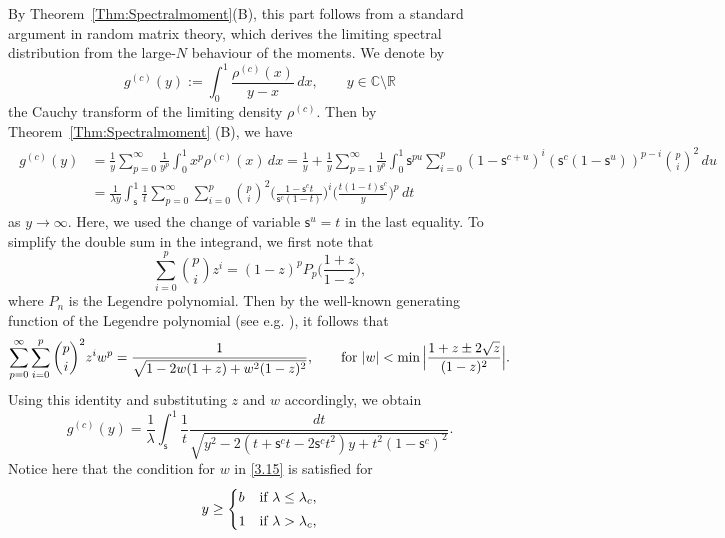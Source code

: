 \documentclass{amsart}
\def\C{\mathbb{C}}
\def\R{\mathbb{R}}
\theoremstyle{plain}
\theoremstyle{remark}
\newcommand{\abs}[1]{\lvert#1\rvert}
\numberwithin{equation}{section}
\begin{document}
By Theorem~\ref{Thm:Spectralmoment}(B), this part follows from a standard argument in random matrix theory, which derives the limiting spectral distribution from the large-$N$ behaviour of the moments.
We denote by  
\begin{equation}
    g^{(c)}(y):=\int_{0}^{1}\frac{\rho^{(c)}(x)}{y-x} \, dx, \qquad y \in \C\setminus \R 
\end{equation}
the Cauchy transform of the limiting density $\rho^{(c)}$. Then by Theorem~\ref{Thm:Spectralmoment} (B), we have 
\begin{align}
\begin{split}
    g^{(c)}(y)
    &= \frac{1}{y}\sum_{p=0}^{\infty}\frac{1}{y^{p}}\int_{0}^{1}x^{p}\rho^{(c)}(x) \, dx
    =\frac{1}{y}+\frac{1}{y}\sum_{p=1}^{\infty}\frac{1}{y^{p}}\int_{0}^{1}\mathsf{s}^{pu}\sum_{i=0}^{p}(1-\mathsf{s}^{c+u})^{i}(\mathsf{s}^{c}(1-\mathsf{s}^{u}))^{p-i}\binom{p}{i}^{2}\, du\\
    &=\frac{1}{\lambda y}\int_{\mathsf{s}}^{1}\frac{1}{t}\sum_{p=0}^{\infty}\sum_{i=0}^{p}\binom{p}{i}^{2}\Big(\frac{1-\mathsf{s}^{c}t}{\mathsf{s}^{c}(1-t)}\Big)^{i}\Big(\frac{t(1-t)\mathsf{s}^{c}}{y}\Big)^{p}\, dt
\end{split}
\end{align} 
as $ y \to \infty.$ Here, we used the change of variable $\mathsf{s}^{u}=t$ in the last equality.
To simplify the double sum in the integrand, we first note that
\begin{equation}
    \sum_{i=0}^{p}\binom{p}{i}z^{i}=(1-z)^{p}P_{p}\Big(\frac{1+z}{1-z}\Big),
\end{equation}
where $P_n$ is the Legendre polynomial. Then by the well-known generating function of the Legendre polynomial (see e.g. \cite[Eq.~(9.8.68)]{KLS10}), it follows that
\begin{equation} \label{3.15}
  \sum_{p=0}^{\infty}\sum_{i=0}^{p}\binom{p}{i}^{2}z^{i}w^{p}=\frac{1}{\sqrt{1-2w(1+z)+w^2 (1-z)^2}}, \qquad \textup{for }\abs{w}<\min{\Big|{\frac{1+z\pm2\sqrt{z}}{(1-z)^2}}}\Big|.
\end{equation}
Using this identity and substituting $z$ and $w$ accordingly, we obtain
\begin{equation}
    g^{(c)}(y)=\frac{1}{\lambda}\int_{\mathsf{s}}^{1}\frac{1}{t}\frac{dt}{\sqrt{y^2 -2(t+\mathsf{s}^{c}t-2\mathsf{s}^{c}t^2)y+t^2(1-\mathsf{s}^{c})^2}}.
\end{equation}
Notice here that the condition for $w$ in \eqref{3.15} is satisfied for
\begin{equation}
    y\geq \begin{cases}
       b& \textup{if } \lambda \leq \lambda_c,
       \smallskip \\
       1 & \textup{if } \lambda >\lambda_c, 
    \end{cases}
\end{equation}
\end{document}
